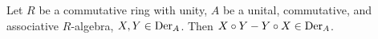 \begin{proposition}
  Let $R$ be a commutative ring with unity,
  $A$ be a unital, commutative, and associative $R$-algebra,
  $X, Y \in {\rm Der}_A$.
  Then $X \circ Y - Y \circ X \in {\rm Der}_A$.
\end{proposition}
